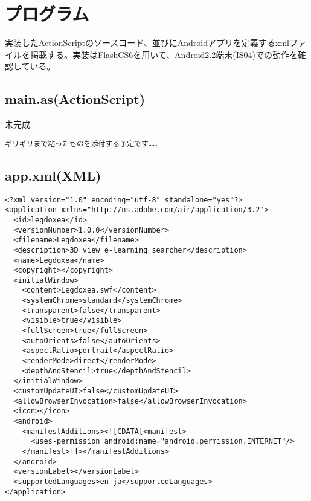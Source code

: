 \chapter{プログラム}
実装したActionScriptのソースコード、並びにAndroidアプリを定義するxmlファイルを掲載する。実装はFlashCS6を用いて、Android2.2端末(IS04)での動作を確認している。

\section{main.as(ActionScript)}
\begin{itembox}[l]{{未完成}}
\begin{verbatim}
ギリギリまで粘ったものを添付する予定です……
\end{verbatim}
\end{itembox}

\section{app.xml(XML)}
{\scriptsize
\begin{verbatim}
<?xml version="1.0" encoding="utf-8" standalone="yes"?>
<application xmlns="http://ns.adobe.com/air/application/3.2">
  <id>legdoxea</id>
  <versionNumber>1.0.0</versionNumber>
  <filename>Legdoxea</filename>
  <description>3D view e-learning searcher</description>
  <name>Legdoxea</name>
  <copyright></copyright>
  <initialWindow>
    <content>Legdoxea.swf</content>
    <systemChrome>standard</systemChrome>
    <transparent>false</transparent>
    <visible>true</visible>
    <fullScreen>true</fullScreen>
    <autoOrients>false</autoOrients>
    <aspectRatio>portrait</aspectRatio>
    <renderMode>direct</renderMode>
    <depthAndStencil>true</depthAndStencil>
  </initialWindow>
  <customUpdateUI>false</customUpdateUI>
  <allowBrowserInvocation>false</allowBrowserInvocation>
  <icon></icon>
  <android>
    <manifestAdditions><![CDATA[<manifest>
      <uses-permission android:name="android.permission.INTERNET"/>
    </manifest>]]></manifestAdditions>
  </android>
  <versionLabel></versionLabel>
  <supportedLanguages>en ja</supportedLanguages>
</application>
\end{verbatim}
 }

